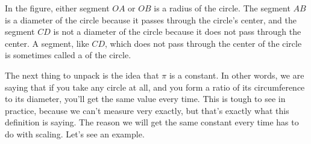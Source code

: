 \documentclass{ximera}
\begin{document}
In the figure, either segment $OA$ or $OB$ is a radius of the circle.   The segment $AB$ is a diameter of the circle because it passes through the circle's center, and the segment $CD$ is not a diameter of the circle because it does not pass through the center. A segment, like $CD$, which does not pass through the center of the circle is sometimes called a  of the circle.

The next thing to unpack is the idea that $\pi$ is a constant. In other words, we are saying that if you take any circle at all, and you form a ratio of its circumference to its diameter, you'll get the same value every time. This is tough to see in practice, because we can't measure very exactly, but that's exactly what this definition is saying. The reason we will get the same constant every time has to do with scaling. Let's see an example.
\end{document}
